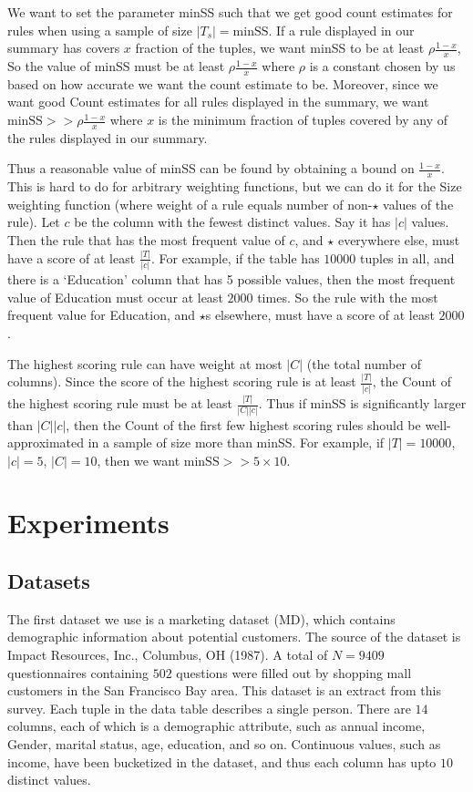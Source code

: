 \documentclass{sig-alternate}
\begin{document}
We want to set the parameter minSS such that we get good count estimates for rules when using a sample of size $|T_s| = \text{minSS}$. If a rule displayed in our summary has covers $x$ fraction of the tuples, we want minSS to be at least $\rho\frac{1-x}{x}$, So the value of minSS must be at least $\rho\frac{1-x}{x}$ where $\rho$ is a constant chosen by us based on how accurate we want the count estimate to be. Moreover, since we want good Count estimates for all rules displayed in the summary, we want $\text{minSS} >> \rho\frac{1-x}{x}$ where $x$ is the minimum fraction of tuples covered by any of the rules displayed in our summary.

Thus a reasonable value of minSS can be found by obtaining a bound on $\frac{1-x}{x}$. This is hard to do for arbitrary weighting functions, but we can do it for the Size weighting function (where weight of a rule equals number of non-$\star$ values of the rule). Let $c$ be the column with the fewest distinct values. Say it has $|c|$ values. Then the rule that has the most frequent value of $c$, and $\star$ everywhere else, must have a score of at least $\frac{|T|}{|c|}$. For example, if the table has $10000$ tuples in all, and there is a `Education' column that has 5 possible values, then the most frequent value of Education must occur at least $2000$ times. So the rule with the most frequent value for Education, and $\star$s elsewhere, must have a score of at least $2000$. 

The highest scoring rule can have weight at most $|C|$ (the total number of columns). Since the score of the highest scoring rule is at least $\frac{|T|}{|c|}$, the Count of the highest scoring rule must be at least $\frac{|T|}{|C||c|}$. Thus if minSS is significantly larger than $|C||c|$, then the Count of the first few highest scoring rules should be well-approximated in a sample of size more than minSS. For example, if $|T| = 10000$, $|c| = 5$, $|C| = 10$, then we want $\text{minSS} >> 5 \times 10$.

\section{Experiments}
\subsection{Datasets}
The first dataset we use is a marketing dataset (MD), which contains demographic information about potential customers. The source of the dataset is Impact Resources, Inc., Columbus, OH (1987). A total of $N=9409$ questionnaires containing $502$ questions were 
filled out by shopping mall customers in the San Francisco Bay area. This dataset is an extract from this survey. Each tuple in the data table describes a single person. There are $14$ columns, each of which is a demographic attribute, such as annual income, Gender, marital status, age, education, and so on. Continuous values, such as income, have been bucketized in the dataset, and thus each column has upto $10$ distinct values. 
\end{document}
